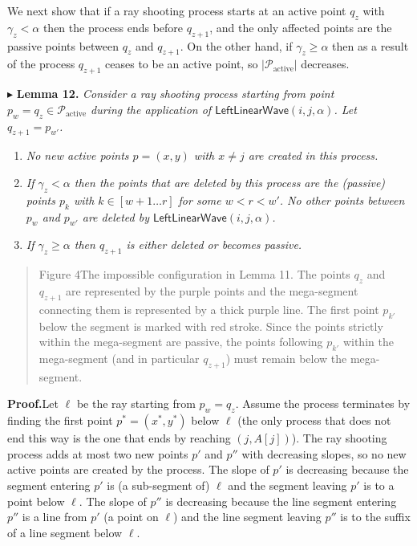\documentclass[11pt]{article}
\newcommand{\Pact}{\mathcal{P}_{\mathrm{active}}}
\newcommand{\Lwave}{\ensuremath{\mathsf{LeftLinearWave}}}
\begin{document}
\smallskip
We next show that if a ray shooting process starts at an active point $q_z$ with $\gamma_z < \alpha$ then
the process ends before $q_{z+1}$, and the only affected points are the passive points between $q_z$
and $q_{z+1}$. On the other hand, if $\gamma_z \ge \alpha$ then as a result of the process $q_{z+1}$ ceases to be an
active point, so $|\Pact|$ decreases.

\smallskip
$\blacktriangleright$ \textbf{Lemma 12.} \emph{Consider a ray shooting process starting from point $p_w = q_z \in \Pact$ during
the application of \Lwave$(i,j,\alpha)$. Let $q_{z+1} = p_{w'}$.}
\begin{enumerate}[label=\arabic*., leftmargin=*, itemsep=0pt, topsep=2pt]
\item \emph{No new active points $p = (x, y)$ with $x \neq j$ are created in this process.}
\item \emph{If $\gamma_z < \alpha$ then the points that are deleted by this process are the (passive) points $p_k$ with
$k \in [w + 1 \ldots r]$ for some $w < r < w'$. No other points between $p_w$ and $p_{w'}$ are deleted by
\Lwave$(i,j,\alpha)$.}
\item \emph{If $\gamma_z \ge \alpha$ then $q_{z+1}$ is either deleted or becomes passive.}
\end{enumerate}


\begin{quote}
\small
Figure 4\quad The impossible configuration in Lemma 11. The points $q_z$ and $q_{z+1}$ are represented by
the purple points and the mega-segment connecting them is represented by a thick purple line. The
first point $p_{k'}$ below the segment is marked with red stroke. Since the points strictly within the
mega-segment are passive, the points following $p_{k'}$ within the mega-segment (and in particular $q_{z+1}$)
must remain below the mega-segment.
\end{quote}

\noindent\textbf{Proof.}\quad Let $\ell$ be the ray starting from $p_w = q_z$. Assume the process terminates by finding the
first point $p^* = (x^*, y^*)$ below $\ell$ (the only process that does not end this way is the one that
ends by reaching $(j, A[j])$). The ray shooting process adds at most two new points $p'$ and $p''$
with decreasing slopes, so no new active points are created by the process. The slope of $p'$ is
decreasing because the segment entering $p'$ is (a sub-segment of) $\ell$ and the segment leaving
$p'$ is to a point below $\ell$. The slope of $p''$ is decreasing because the line segment entering $p''$ is
a line from $p'$ (a point on $\ell$) and the line segment leaving $p''$ is to the suffix of a line segment
below $\ell$.
\end{document}
